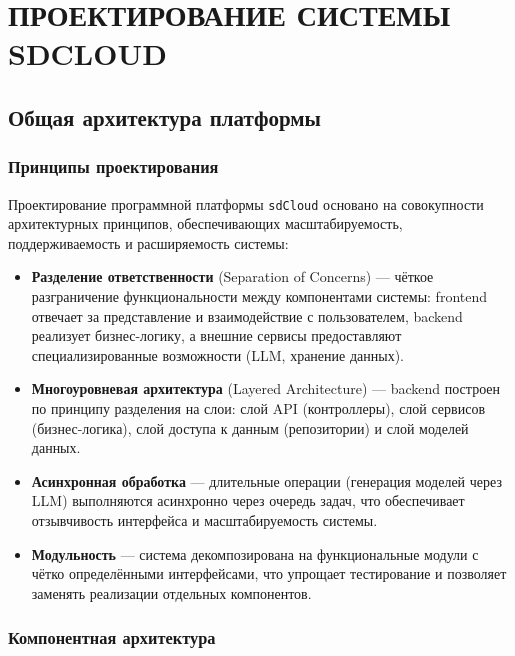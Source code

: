
\chapter{ПРОЕКТИРОВАНИЕ СИСТЕМЫ SDCLOUD}

\section{Общая архитектура платформы}

\subsection{Принципы проектирования}

Проектирование программной платформы \texttt{sdCloud} основано на совокупности архитектурных принципов, обеспечивающих масштабируемость, поддерживаемость и расширяемость системы:

\begin{itemize}
    \item \textbf{Разделение ответственности} (Separation of Concerns) --- чёткое разграничение функциональности между компонентами системы: frontend отвечает за представление и взаимодействие с пользователем, backend реализует бизнес-логику, а внешние сервисы предоставляют специализированные возможности (LLM, хранение данных).
    \item \textbf{Многоуровневая архитектура} (Layered Architecture) --- backend построен по принципу разделения на слои: слой API (контроллеры), слой сервисов (бизнес-логика), слой доступа к данным (репозитории) и слой моделей данных.
    \item \textbf{Асинхронная обработка} --- длительные операции (генерация моделей через LLM) выполняются асинхронно через очередь задач, что обеспечивает отзывчивость интерфейса и масштабируемость системы.
    \item \textbf{Модульность} --- система декомпозирована на функциональные модули с чётко определёнными интерфейсами, что упрощает тестирование и позволяет заменять реализации отдельных компонентов.
\end{itemize}

\subsection{Компонентная архитектура}

